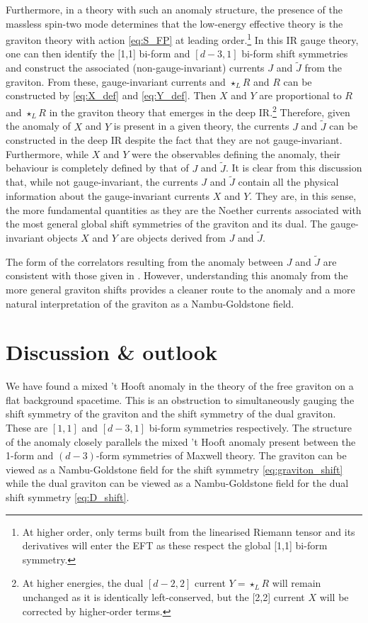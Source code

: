 Furthermore, in a theory with such an anomaly structure, the presence of the massless spin-two mode determines that the low-energy effective theory is the graviton theory with action \eqref{eq:S_FP} at leading order.\footnote{At higher order, only terms built from the linearised Riemann tensor and its derivatives will enter the EFT as these respect the global [1,1] bi-form symmetry.} In this IR gauge theory, one can then identify the [1,1] bi-form and $[d-3,1]$ bi-form shift symmetries and construct the associated (non-gauge-invariant) currents $J$ and $\tilde{J}$ from the graviton. 
From these, gauge-invariant currents and $\star_L R$ and $R$ can be constructed by \eqref{eq:X_def} and \eqref{eq:Y_def}. Then $X$ and $Y$ are proportional to $R$ and $\star_L R$ in the graviton theory that emerges in the deep IR.\footnote{At higher energies, the dual $[d-2,2]$ current $Y =\star_L R$ will remain unchanged as it is identically left-conserved, but the [2,2] current $X$ will be corrected by higher-order terms.}
Therefore, given the anomaly of $X$ and $Y$ is present in a given theory, the currents $J$ and $\tilde{J}$ can be constructed in the deep IR despite the fact that they are not gauge-invariant.
Furthermore, while $X$ and $Y$ were the observables defining the anomaly, their behaviour is completely defined by that of $J$ and $\tilde{J}$.
It is clear from this discussion that, while not gauge-invariant, the currents $J$ and $\tilde{J}$ contain all the physical information about the gauge-invariant currents $X$ and $Y$. They are, in this sense, the more fundamental quantities as they are the Noether currents associated with the most general global shift symmetries of the graviton and its dual. The gauge-invariant objects $X$ and $Y$ are objects derived from $J$ and $\tilde{J}$.

The form of the correlators resulting from the anomaly between $J$ and $\tilde{J}$ are consistent with those given in \cite{Hinterbichler2023GravitySymmetries}. However, understanding this anomaly from the more general graviton shifts provides a cleaner route to the anomaly and a more natural interpretation of the graviton as a Nambu-Goldstone field.

\section{Discussion \& outlook}
\label{sec:discussion}

We have found a mixed 't Hooft anomaly in the theory of the free graviton on a flat background spacetime. This is an obstruction to simultaneously gauging the shift symmetry of the graviton and the shift symmetry of the dual graviton. These are $[1,1]$ and $[d-3,1]$ bi-form symmetries respectively. The structure of the anomaly closely parallels the mixed 't Hooft anomaly present between the 1-form and $(d-3)$-form symmetries of Maxwell theory. 
The graviton can be viewed as a Nambu-Goldstone field for the shift symmetry \eqref{eq:graviton_shift} while the dual graviton can be viewed as a Nambu-Goldstone field for the dual shift symmetry \eqref{eq:D_shift}.

